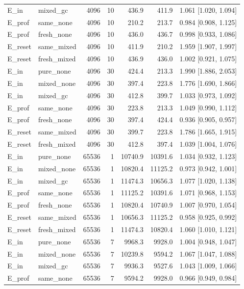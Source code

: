 \begin{longtable}{llrrrrc}
E\_in & mixed\_gc & 4096 & 10 & 436.9 & 411.9 & 1.061 [1.020, 1.094] \\
E\_prof & same\_none & 4096 & 10 & 210.2 & 213.7 & 0.984 [0.908, 1.125] \\
E\_prof & fresh\_none & 4096 & 10 & 436.0 & 436.7 & 0.998 [0.933, 1.086] \\
E\_reset & same\_mixed & 4096 & 10 & 411.9 & 210.2 & 1.959 [1.907, 1.997] \\
E\_reset & fresh\_mixed & 4096 & 10 & 436.9 & 436.0 & 1.002 [0.921, 1.075] \\
E\_in & pure\_none & 4096 & 30 & 424.4 & 213.3 & 1.990 [1.886, 2.053] \\
E\_in & mixed\_none & 4096 & 30 & 397.4 & 223.8 & 1.776 [1.690, 1.866] \\
E\_in & mixed\_gc & 4096 & 30 & 412.8 & 399.7 & 1.033 [0.973, 1.092] \\
E\_prof & same\_none & 4096 & 30 & 223.8 & 213.3 & 1.049 [0.990, 1.112] \\
E\_prof & fresh\_none & 4096 & 30 & 397.4 & 424.4 & 0.936 [0.905, 0.957] \\
E\_reset & same\_mixed & 4096 & 30 & 399.7 & 223.8 & 1.786 [1.665, 1.915] \\
E\_reset & fresh\_mixed & 4096 & 30 & 412.8 & 397.4 & 1.039 [1.004, 1.076] \\
E\_in & pure\_none & 65536 & 1 & 10740.9 & 10391.6 & 1.034 [0.932, 1.123] \\
E\_in & mixed\_none & 65536 & 1 & 10820.4 & 11125.2 & 0.973 [0.942, 1.001] \\
E\_in & mixed\_gc & 65536 & 1 & 11474.3 & 10656.3 & 1.077 [1.020, 1.138] \\
E\_prof & same\_none & 65536 & 1 & 11125.2 & 10391.6 & 1.071 [0.968, 1.153] \\
E\_prof & fresh\_none & 65536 & 1 & 10820.4 & 10740.9 & 1.007 [0.970, 1.054] \\
E\_reset & same\_mixed & 65536 & 1 & 10656.3 & 11125.2 & 0.958 [0.925, 0.992] \\
E\_reset & fresh\_mixed & 65536 & 1 & 11474.3 & 10820.4 & 1.060 [1.010, 1.121] \\
E\_in & pure\_none & 65536 & 7 & 9968.3 & 9928.0 & 1.004 [0.948, 1.047] \\
E\_in & mixed\_none & 65536 & 7 & 10239.8 & 9594.2 & 1.067 [1.047, 1.088] \\
E\_in & mixed\_gc & 65536 & 7 & 9936.3 & 9527.6 & 1.043 [1.009, 1.066] \\
E\_prof & same\_none & 65536 & 7 & 9594.2 & 9928.0 & 0.966 [0.949, 0.984] \\

\end{longtable}
